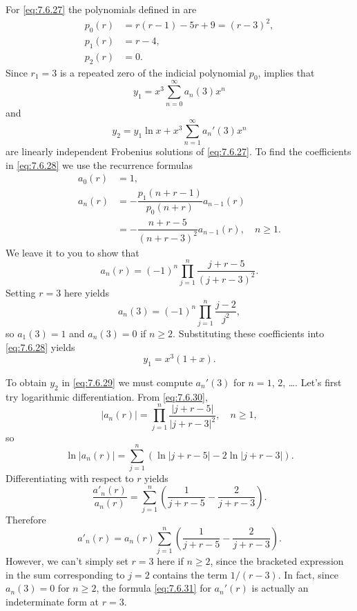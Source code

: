 \begin{solution}
For \eqref{eq:7.6.27} the polynomials defined in 
are
\begin{align*}
p_0(r)&=r(r-1)-5r+9=(r-3)^2,\\
p_1(r)&=r-4,\\
p_2(r)&=0.
\end{align*}
Since $r_1=3$ is a repeated zero of the  indicial polynomial $p_0$,
 implies that
\begin{equation} \label{eq:7.6.28}
y_1=x^3\sum_{n=0}^\infty  a_n(3)x^n
\end{equation}
and
\begin{equation} \label{eq:7.6.29}
y_2=y_1\ln x+x^3\sum_{n=1}^\infty a_n'(3)x^n
\end{equation}
are linearly independent Frobenius solutions of \eqref{eq:7.6.27}.
To find the coefficients in \eqref{eq:7.6.28} we use the recurrence
formulas
\begin{align*}
a_0(r)&=1,\\
a_n(r)&=-\dfrac{p_1(n+r-1)}{p_0(n+r)}a_{n-1}(r)\\
&=-\dfrac{n+r-5}{(n+r-3)^2}a_{n-1}(r),\quad n\ge1.
\end{align*}
We leave it to you to show that
\begin{equation} \label{eq:7.6.30}
a_n(r)=(-1)^n\prod_{j=1}^n\frac{j+r-5}{(j+r-3)^2}.
\end{equation}
Setting $r=3$ here yields
\[
a_n(3)=(-1)^n\prod_{j=1}^n\frac{j-2}{j^2},
\]
so  $a_1(3)=1$ and $a_n(3)=0$ if $n\ge2$. Substituting
these coefficients into \eqref{eq:7.6.28} yields
\[
y_1=x^3(1+x).
\]

To obtain $y_2$ in \eqref{eq:7.6.29} we must compute $a_n'(3)$
for $n=1$, $2$, \dots.
 Let's first try  logarithmic differentiation.
From \eqref{eq:7.6.30},
\[
|a_n(r)|=\prod_{j=1}^n\frac{|j+r-5|}{|j+r-3|^2},\quad n\ge1,
\]
so
\[
\ln |a_n(r)|=\sum^n_{j=1} \left(\ln |j+r-5|-2\ln|j+r-3|\right).
\]
Differentiating  with respect to $r$ yields
\[
\frac{a'_n(r)}{a_n(r)}=\sum^n_{j=1} \left(\frac{1}{j+r-5}-\frac{2}{j+r-3}\right).
\]
Therefore
\begin{equation} \label{eq:7.6.31}
a'_n(r)=a_n(r) \sum^n_{j=1} \left(\frac{1}{j+r-5}-\frac{2}{j+r-3}\right).
\end{equation}
However, we can't simply set $r=3$ here if $n\ge2$,  since the bracketed
expression in the sum corresponding to  $j=2$ contains the term $1/(r-3)$.
In fact, since $a_n(3)=0$ for $n\ge2$, the  formula \eqref{eq:7.6.31} for
$a_n'(r)$ is actually an indeterminate form at $r=3$.


\end{solution}
